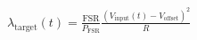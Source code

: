 \documentclass[convert={outext=.svg,density=750}]{standalone}
\begin{document}
$
    \lambda_{\text{target}}(t)=\frac{\text{FSR}}{P_{\text{FSR}}} \frac{(V_\text{input}(t)-V_\text{offset})^2}{R}
$
\end{document}

